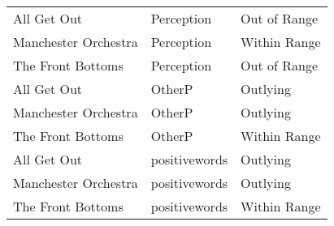 \documentclass{article}\usepackage[]{graphicx}\usepackage[]{xcolor}
\begin{document}
\begin{table}[ht]
\begin{tabular}{lll}
  All Get Out & Perception & Out of Range \\ 
  Manchester Orchestra & Perception & Within Range \\ 
  The Front Bottoms & Perception & Out of Range \\ 
  All Get Out & OtherP & Outlying \\ 
  Manchester Orchestra & OtherP & Outlying \\ 
  The Front Bottoms & OtherP & Within Range \\ 
  All Get Out & positivewords & Outlying \\ 
  Manchester Orchestra & positivewords & Outlying \\ 
  The Front Bottoms & positivewords & Within Range \\ 
   \hline
\end{tabular}
\end{table}
\end{document}
